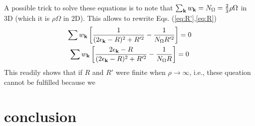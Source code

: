 \documentclass{article}
\begin{document}
A possible trick to solve these equations is to note that $\sum_{\mathbf{k}}{}w_{\mathbf{k}}=N_\Omega=\frac23\rho\Omega$ in 3D (which it is $\rho\Omega$ in 2D).  This allows to rewrite Eqs. (\ref{eq:R'},\ref{eq:R})
\begin{gather}
\sum{}w_{\mathbf{k}}\left[\frac{1}{(2\epsilon_{\mathbf{k}}-R)^2+R'^2}-\frac{1}{N_\Omega{}R'^2}\right]=0\\
\sum{}w_{\mathbf{k}}\left[\frac{2\epsilon_{\mathbf{k}}-R}{(2\epsilon_{\mathbf{k}}-R)^2+R'^2}-\frac{1}{N_\Omega{}R}\right]=0
\end{gather}
This readily shows that if $R$ and $R'$ were finite when $\rho\rightarrow\infty$, i.e., these queation cannot be fulfilled because we 

\section{conclusion\label{sec:conclusion}}


%

\end{document}
